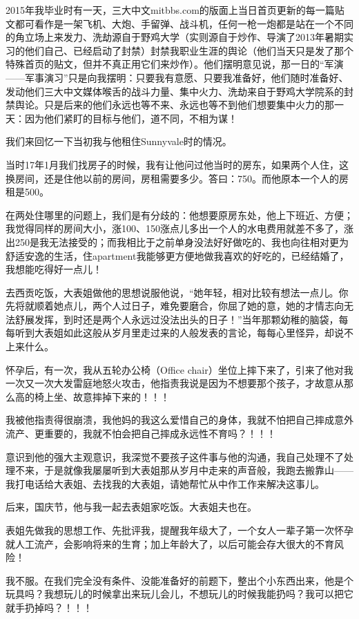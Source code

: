 \documentclass[9pt, b5paper]{article}
\begin{document}
2015年我毕业时有一天，三大中文mitbbs.com的版面上当日首页更新的每一篇贴文都可看作是一架飞机、大炮、手留弹、战斗机，任何一枪一炮都是站在一个不同的角立场上来发力、洗劫源自于野鸡大学（实则源自于炒作、导演了2013年暑期实习的他们自己、已经启动了封禁）封禁我职业生涯的舆论（他们当天只是发了那个特殊首页的贴文，但并不真正用它们来炒作）。他们摆明意见说，那一日的“军演——军事演习”只是向我摆明：只要我有意愿、只要我准备好，他们随时准备好、发动他们三大中文媒体喉舌的战斗力量、集中火力、洗劫来自于野鸡大学院系的封禁舆论。只是后来的他们永远也等不来、永远也等不到他们想要集中火力的那一天：因为他们紧盯的目标与他们，道不同，不相为谋！

我们来回忆一下当初我与他租住Sunnyvale时的情况。

当时17年1月我们找房子的时候，我有让他问过他当时的房东，如果两个人住，这换房间，还是住他以前的房间，房租需要多少。答曰：750。而他原本一个人的房租是500。

在两处住哪里的问题上，我们是有分歧的：他想要原房东处，他上下班近、方便；我觉得同样的房间大小，涨100、150涨点儿多出一个人的水电费用就差不多了，涨出250是我无法接受的；而我相比于之前单身没法好好做吃的、我也向往相对更为舒适安逸的生活，住apartment我能够更方便地做我喜欢的好吃的，已经结婚了，我想能吃得好一点儿！

去西贡吃饭，大表姐做他的思想说服他说，“她年轻，相对比较有想法一点儿。你先将就顺着她点儿，两个人过日子，难免要磨合，你屈了她的意，她的才情志向无法舒展发挥，到时还是两个人永远过没法出头的日子！”当年那颗幼稚的脑袋，每每听到大表姐如此这般从岁月里走过来的人般发表的言论，每每心里怪异，却说不上来什么。

怀孕后，有一次，我从五轮办公椅（Office chair）坐位上摔下来了，引来了他对我一次又一次大发雷庭地怒火攻击，他指责我说是因为不想要那个孩子，才故意从那么高的椅上坐、故意摔掉下来的！！！

我被他指责得很崩溃，我他妈的我这么爱惜自己的身体，我就不怕把自己摔成意外流产、更重要的，我就不怕会把自己摔成永远性不育吗？！！！

意识到他的强大主观意识，我深觉不要孩子这件事与他的沟通，我自己处理不了处理不来，于是就像我屡屡听到大表姐那从岁月中走来的声音般，我跑去搬靠山——我打电话给大表姐、去找我的大表姐，请她帮忙从中作工作来解决这事儿。 

后来，国庆节，他与我一起去表姐家吃饭。大表姐夫也在。

表姐先做我的思想工作、先批评我，提醒我年级大了，一个女人一辈子第一次怀孕就人工流产，会影响将来的生育；加上年龄大了，以后可能会存大很大的不育风险！

我不服。在我们完全没有条件、没能准备好的前题下，整出个小东西出来，他是个玩具吗？我想玩儿的时候拿出来玩儿会儿，不想玩儿的时候我能扔吗？我可以把它就手扔掉吗？！！！
\end{document}
